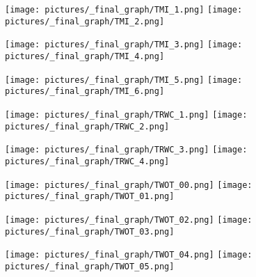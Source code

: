\begin{figure} \ContinuedFloat
        \centering
        \texttt{[image: pictures/\_final\_graph/TMI\_1.png]}
        \texttt{[image: pictures/\_final\_graph/TMI\_2.png]}
\end{figure}
\begin{figure} \ContinuedFloat
        \centering
        \texttt{[image: pictures/\_final\_graph/TMI\_3.png]}
        \texttt{[image: pictures/\_final\_graph/TMI\_4.png]}
\end{figure}
\begin{figure} \ContinuedFloat
        \centering
        \texttt{[image: pictures/\_final\_graph/TMI\_5.png]}
        \texttt{[image: pictures/\_final\_graph/TMI\_6.png]}
\end{figure}
\begin{figure} \ContinuedFloat
        \centering
        \texttt{[image: pictures/\_final\_graph/TRWC\_1.png]}
        \texttt{[image: pictures/\_final\_graph/TRWC\_2.png]}
\end{figure}
\begin{figure} \ContinuedFloat
        \centering
        \texttt{[image: pictures/\_final\_graph/TRWC\_3.png]}
        \texttt{[image: pictures/\_final\_graph/TRWC\_4.png]}
\end{figure}
\begin{figure} \ContinuedFloat
        \centering
        \texttt{[image: pictures/\_final\_graph/TWOT\_00.png]}
        \texttt{[image: pictures/\_final\_graph/TWOT\_01.png]}
\end{figure}
\begin{figure} \ContinuedFloat
        \centering
        \texttt{[image: pictures/\_final\_graph/TWOT\_02.png]}
        \texttt{[image: pictures/\_final\_graph/TWOT\_03.png]}
\end{figure}
\begin{figure} \ContinuedFloat
        \centering
        \texttt{[image: pictures/\_final\_graph/TWOT\_04.png]}
        \texttt{[image: pictures/\_final\_graph/TWOT\_05.png]}
\end{figure}
